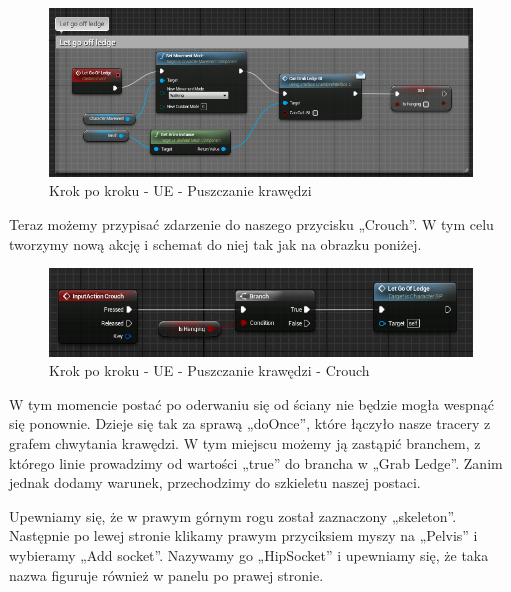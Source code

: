 \documentclass[openright]{xmgr}
\begin{document}
\begin{figure}[!htb]
    \begin{center}
    \includegraphics[scale=0.5]{Screeny/UeKrokPoKroku/LetGoOfLedge}
    \end{center}
    \caption{Krok po kroku - UE - Puszczanie krawędzi}
\end{figure}

Teraz możemy przypisać zdarzenie do naszego przycisku „Crouch”. W tym celu tworzymy nową akcję i schemat do niej tak jak na obrazku poniżej.

\begin{figure}[!htb]
    \begin{center}
    \includegraphics[scale=0.5]{Screeny/UeKrokPoKroku/Crouch}
    \end{center}
    \caption{Krok po kroku - UE - Puszczanie krawędzi - Crouch}
\end{figure}

W tym momencie postać po oderwaniu się od ściany nie będzie mogła wespnąć się ponownie. Dzieje się tak za sprawą „doOnce”, które łączyło nasze tracery z grafem chwytania krawędzi. W tym miejscu możemy ją zastąpić branchem, z którego linie prowadzimy od wartości „true” do brancha w „Grab Ledge”. Zanim jednak dodamy warunek, przechodzimy do szkieletu naszej postaci.

Upewniamy się, że w prawym górnym rogu został zaznaczony „skeleton”. Następnie po lewej stronie klikamy prawym przyciksiem myszy na „Pelvis” i wybieramy „Add socket”. Nazywamy go „HipSocket” i upewniamy się, że taka nazwa figuruje również w panelu po prawej stronie.
\end{document}
